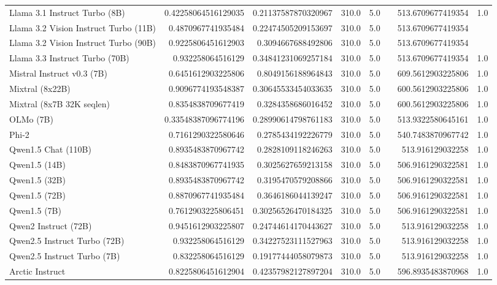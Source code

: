 \begin{table}[htp]
{\begin{tabular}{lrrrrrrr}
Llama 3.1 Instruct Turbo (8B) & 0.42258064516129035 & 0.21137587870320967 & 310.0 & 5.0 &  & 513.6709677419354 & 1.0 \\
Llama 3.2 Vision Instruct Turbo (11B) & 0.4870967741935484 & 0.22474505209153697 & 310.0 & 5.0 &  & 513.6709677419354 &  \\
Llama 3.2 Vision Instruct Turbo (90B) & 0.9225806451612903 & 0.3094667688492806 & 310.0 & 5.0 &  & 513.6709677419354 &  \\
Llama 3.3 Instruct Turbo (70B) & 0.932258064516129 & 0.34841231069257184 & 310.0 & 5.0 &  & 513.6709677419354 & 1.0 \\
Mistral Instruct v0.3 (7B) & 0.6451612903225806 & 0.8049156188964843 & 310.0 & 5.0 &  & 609.5612903225806 & 1.0 \\
Mixtral (8x22B) & 0.9096774193548387 & 0.30645533454033635 & 310.0 & 5.0 &  & 600.5612903225806 & 1.0 \\
Mixtral (8x7B 32K seqlen) & 0.8354838709677419 & 0.3284358686016452 & 310.0 & 5.0 &  & 600.5612903225806 & 1.0 \\
OLMo (7B) & 0.33548387096774196 & 0.28990614798761183 & 310.0 & 5.0 &  & 513.9322580645161 & 1.0 \\
Phi-2 & 0.7161290322580646 & 0.2785434192226779 & 310.0 & 5.0 &  & 540.7483870967742 & 1.0 \\
Qwen1.5 Chat (110B) & 0.8935483870967742 & 0.2828109118246263 & 310.0 & 5.0 &  & 513.916129032258 & 1.0 \\
Qwen1.5 (14B) & 0.8483870967741935 & 0.3025627659213158 & 310.0 & 5.0 &  & 506.9161290322581 & 1.0 \\
Qwen1.5 (32B) & 0.8935483870967742 & 0.3195470579208866 & 310.0 & 5.0 &  & 506.9161290322581 & 1.0 \\
Qwen1.5 (72B) & 0.8870967741935484 & 0.3646186044139247 & 310.0 & 5.0 &  & 506.9161290322581 & 1.0 \\
Qwen1.5 (7B) & 0.7612903225806451 & 0.30256526470184325 & 310.0 & 5.0 &  & 506.9161290322581 & 1.0 \\
Qwen2 Instruct (72B) & 0.9451612903225807 & 0.24744614170443627 & 310.0 & 5.0 &  & 513.916129032258 & 1.0 \\
Qwen2.5 Instruct Turbo (72B) & 0.932258064516129 & 0.34227523111527963 & 310.0 & 5.0 &  & 513.916129032258 & 1.0 \\
Qwen2.5 Instruct Turbo (7B) & 0.832258064516129 & 0.19177444058079873 & 310.0 & 5.0 &  & 513.916129032258 & 1.0 \\
Arctic Instruct & 0.8225806451612904 & 0.42357982127897204 & 310.0 & 5.0 &  & 596.8935483870968 & 1.0 \\

\end{tabular}}
\end{table}
